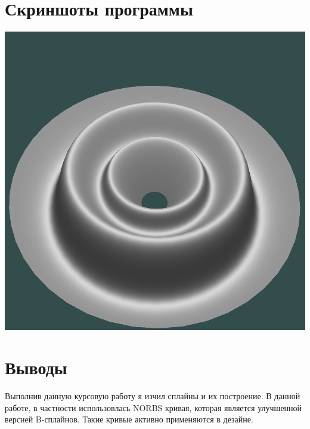 \section{Скриншоты программы}
\includegraphics[scale=0.45]{KP_1.png}
\section{Выводы}
Выполнив данную курсовую работу я изчил сплайны и их построение. В данной работе, в
частности использовлась NORBS кривая, которая является улучшенной версией B-сплайнов.
Такие кривые активно применяются в дезайне.
\pagebreak
